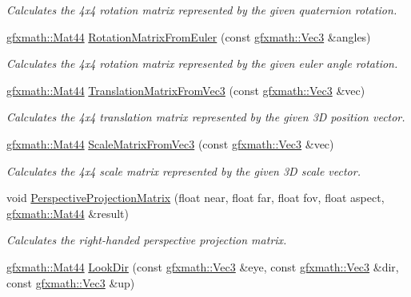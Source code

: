 \begin{DoxyCompactItemize}
\begin{DoxyCompactList}\small\item\em Calculates the 4x4 rotation matrix represented by the given quaternion rotation. \end{DoxyCompactList}\item 
\hyperlink{structgfxmath_1_1_mat44}{gfxmath\+::\+Mat44} \hyperlink{structgfxmath_1_1_mat44_a1ad00d3968393a11454fe717157a909f}{Rotation\+Matrix\+From\+Euler} (const \hyperlink{structgfxmath_1_1_vec3}{gfxmath\+::\+Vec3} \&angles)
\begin{DoxyCompactList}\small\item\em Calculates the 4x4 rotation matrix represented by the given euler angle rotation. \end{DoxyCompactList}\item 
\hyperlink{structgfxmath_1_1_mat44}{gfxmath\+::\+Mat44} \hyperlink{structgfxmath_1_1_mat44_afc76b3bbefb68b451e83ad0276581c2e}{Translation\+Matrix\+From\+Vec3} (const \hyperlink{structgfxmath_1_1_vec3}{gfxmath\+::\+Vec3} \&vec)
\begin{DoxyCompactList}\small\item\em Calculates the 4x4 translation matrix represented by the given 3\+D position vector. \end{DoxyCompactList}\item 
\hyperlink{structgfxmath_1_1_mat44}{gfxmath\+::\+Mat44} \hyperlink{structgfxmath_1_1_mat44_a4542600da8cc67efe4d56113b468694f}{Scale\+Matrix\+From\+Vec3} (const \hyperlink{structgfxmath_1_1_vec3}{gfxmath\+::\+Vec3} \&vec)
\begin{DoxyCompactList}\small\item\em Calculates the 4x4 scale matrix represented by the given 3\+D scale vector. \end{DoxyCompactList}\item 
void \hyperlink{structgfxmath_1_1_mat44_aeca98ca3f64100b5056ca608fa22582a}{Perspective\+Projection\+Matrix} (float near, float far, float fov, float aspect, \hyperlink{structgfxmath_1_1_mat44}{gfxmath\+::\+Mat44} \&result)
\begin{DoxyCompactList}\small\item\em Calculates the right-\/handed perspective projection matrix. \end{DoxyCompactList}\item 
\hyperlink{structgfxmath_1_1_mat44}{gfxmath\+::\+Mat44} \hyperlink{structgfxmath_1_1_mat44_ada14bb2a22069f14dc030af9bb78ffff}{Look\+Dir} (const \hyperlink{structgfxmath_1_1_vec3}{gfxmath\+::\+Vec3} \&eye, const \hyperlink{structgfxmath_1_1_vec3}{gfxmath\+::\+Vec3} \&dir, const \hyperlink{structgfxmath_1_1_vec3}{gfxmath\+::\+Vec3} \&up)

\end{DoxyCompactItemize}
